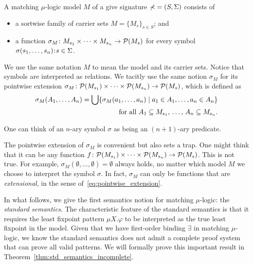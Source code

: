 \documentclass{amsart}
\begin{document}
\begin{definition}
A matching $\mu$-logic model $M$ of a give signature $\mathbb{\Sigma} = (S, \Sigma)$
consists of
\begin{itemize}
\item a sortwise family of carrier sets $M = \{M_s\}_{s \in S}$; and
\item a function 
$\sigma_M \colon M_{s_1} \times \dots \times M_{s_n} \to \mathcal{P}(M_s)$
for every symbol $\sigma(s_1,\dots,s_n) \mathbin{\!:\!} s \in \Sigma$.
\end{itemize}
\end{definition}
We use the same notation $M$ to mean the model and its carrier sets. 
Notice that symbols are interpreted as relations. 
We tacitly use the same notion $\sigma_M$ for its
pointwise extension 
$\sigma_M \colon \mathcal{P}(M_{s_1}) \times \dots \times \mathcal{P}(M_{s_n}) 
\to \mathcal{P}(M_s)$, which is defined as
\begin{align}
\label{eq:pointwise_extension}
\sigma_M(A_1,\dots,A_n) = \bigcup 
\{ \sigma_M(a_1,\dots,a_n) \mid  
a_1 \in A_1, \dots, a_n \in A_n
\}\\
\quad \text{for all $A_1 \subseteq M_{s_1}$, \dots, $A_n \subseteq M_{s_n}$}.
\end{align}

\begin{remark}

One can think of an $n$-ary symbol $\sigma$
as being an $(n+1)$-ary predicate.

\end{remark}

\begin{remark}

The pointwise extension of $\sigma_M$ is convenient but also sets a trap.
One might think that it can be any function
$f \colon \mathcal{P}(M_{s_1}) \times \dots \times \mathcal{P}( M_{s_n}) \to \mathcal{P}(M_s)$.
This is not true.
For example, $\sigma_M(\emptyset,\dots,\emptyset) = \emptyset$ always holds,
no matter which model $M$ we choose to interpret the symbol $\sigma$.
In fact, $\sigma_M$ can only be functions that are \emph{extensional},
in the sense of~\eqref{eq:pointwise_extension}.

\end{remark}

In what follows, we give the first semantics notion for
matching $\mu$-logic: the \emph{standard semantics}. 
The characteristic feature of the standard semantics
is that it requires the least fixpoint pattern $\mu X . \varphi$
to be interpreted as the true least fixpoint in the model.
Given that we have first-order binding $\exists$ in matching $\mu$-logic,
we know the standard semantics does not admit a complete proof system
that can prove all valid patterns.
We will formally prove this important result in Theorem~\ref{thm:std_semantics_incomplete}.
\end{document}
